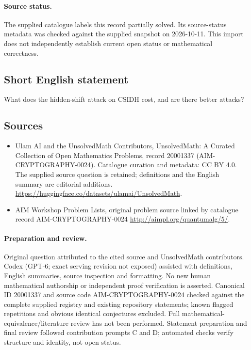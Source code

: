 \documentclass[11pt]{article}
\begin{document}
\paragraph{Source status.}
The supplied catalogue labels this record partially solved. Its source-status metadata was checked against the supplied snapshot on 2026-10-11. This import does not independently establish current open status or mathematical correctness.
\subsection{Short English statement}
What does the hidden-shift attack on CSIDH cost, and are there better attacks?
\subsection{Sources}
\begin{itemize}
\item[S1] Ulam AI and the UnsolvedMath Contributors, UnsolvedMath: A Curated Collection of Open Mathematics Problems, record 20001337 (AIM-CRYPTOGRAPHY-0024). Catalogue curation and metadata: CC BY 4.0. The supplied source question is retained; definitions and the English summary are editorial additions.
\url{https://huggingface.co/datasets/ulamai/UnsolvedMath}.
\item[S2] AIM Workshop Problem Lists, original problem source linked by catalogue record AIM-CRYPTOGRAPHY-0024
\url{http://aimpl.org/quantumalg/5/}.
\end{itemize}
\paragraph{Preparation and review.}
Original question attributed to the cited source and UnsolvedMath contributors. Codex (GPT-6; exact serving revision not exposed) assisted with definitions, English summaries, source inspection and formatting. No new human mathematical authorship or independent proof verification is asserted. Canonical ID 20001337 and source code AIM-CRYPTOGRAPHY-0024 checked against the complete supplied registry and existing repository statements; known flagged repetitions and obvious identical conjectures excluded. Full mathematical-equivalence/literature review has not been performed. Statement preparation and final review followed contribution prompts C and D; automated checks verify structure and identity, not open status.
\label{end:20001337}
\end{document}
